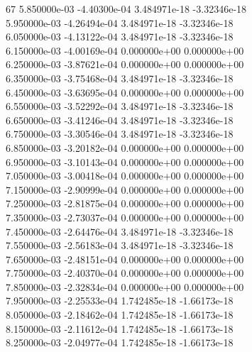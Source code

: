 67	5.850000e-03	-4.40300e-04	3.484971e-18	-3.32346e-18	\\ 	5.950000e-03	-4.26494e-04	3.484971e-18	-3.32346e-18	\\ 	6.050000e-03	-4.13122e-04	3.484971e-18	-3.32346e-18	\\ 	6.150000e-03	-4.00169e-04	0.000000e+00	0.000000e+00	\\ 	6.250000e-03	-3.87621e-04	0.000000e+00	0.000000e+00	\\ 	6.350000e-03	-3.75468e-04	3.484971e-18	-3.32346e-18	\\ 	6.450000e-03	-3.63695e-04	0.000000e+00	0.000000e+00	\\ 	6.550000e-03	-3.52292e-04	3.484971e-18	-3.32346e-18	\\ 	6.650000e-03	-3.41246e-04	3.484971e-18	-3.32346e-18	\\ 	6.750000e-03	-3.30546e-04	3.484971e-18	-3.32346e-18	\\ 	6.850000e-03	-3.20182e-04	0.000000e+00	0.000000e+00	\\ 	6.950000e-03	-3.10143e-04	0.000000e+00	0.000000e+00	\\ 	7.050000e-03	-3.00418e-04	0.000000e+00	0.000000e+00	\\ 	7.150000e-03	-2.90999e-04	0.000000e+00	0.000000e+00	\\ 	7.250000e-03	-2.81875e-04	0.000000e+00	0.000000e+00	\\ 	7.350000e-03	-2.73037e-04	0.000000e+00	0.000000e+00	\\ 	7.450000e-03	-2.64476e-04	3.484971e-18	-3.32346e-18	\\ 	7.550000e-03	-2.56183e-04	3.484971e-18	-3.32346e-18	\\ 	7.650000e-03	-2.48151e-04	0.000000e+00	0.000000e+00	\\ 	7.750000e-03	-2.40370e-04	0.000000e+00	0.000000e+00	\\ 	7.850000e-03	-2.32834e-04	0.000000e+00	0.000000e+00	\\ 	7.950000e-03	-2.25533e-04	1.742485e-18	-1.66173e-18	\\ 	8.050000e-03	-2.18462e-04	1.742485e-18	-1.66173e-18	\\ 	8.150000e-03	-2.11612e-04	1.742485e-18	-1.66173e-18	\\ 	8.250000e-03	-2.04977e-04	1.742485e-18	-1.66173e-18	\\ \hline
